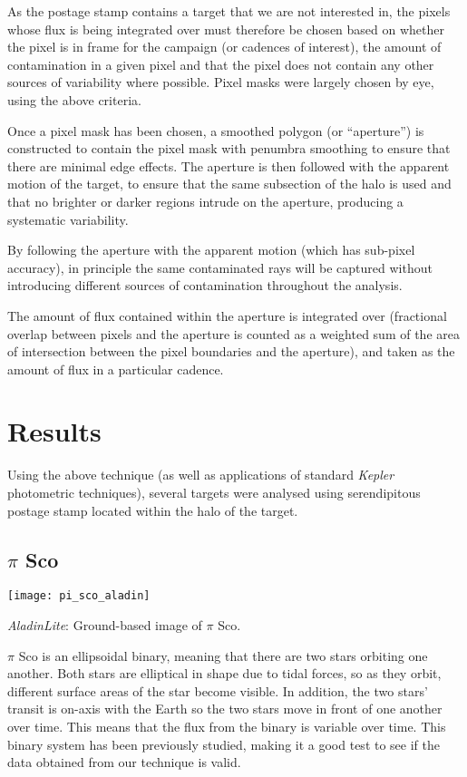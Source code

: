 \documentclass{book}
\begin{document}
As the postage stamp contains a target that we are not interested in, the
pixels whose flux is being integrated over must therefore be chosen based on
whether the pixel is in frame for the campaign (or cadences of interest), the
amount of contamination in a given pixel and that the pixel does not contain
any other sources of variability where possible. Pixel masks were largely chosen
by eye, using the above criteria.

Once a pixel mask has been chosen, a smoothed polygon (or ``aperture'') is
constructed to contain the pixel mask with penumbra smoothing to ensure that
there are minimal edge effects. The aperture is then followed with the apparent
motion of the target, to ensure that the same subsection of the halo is used and
that no brighter or darker regions intrude on the aperture, producing a
systematic variability.

By following the aperture with the apparent motion (which has sub-pixel
accuracy), in principle the same contaminated rays will be captured without
introducing different sources of contamination throughout the analysis.

The amount of flux contained within the aperture is integrated over (fractional
overlap between pixels and the aperture is counted as a weighted sum of the
area of intersection between the pixel boundaries and the aperture), and taken
as the amount of flux in a particular cadence.

\section{Results}

Using the above technique (as well as applications of standard \textit{Kepler}
photometric techniques), several targets were analysed using serendipitous
postage stamp located within the halo of the target.

\subsection{$\pi$ Sco}

\begin{staticfigure}
	\centering
		\texttt{[image: pi\_sco\_aladin]}
	\caption{\textit{AladinLite}: Ground-based image of $\pi$ Sco.}
\end{staticfigure}

$\pi$ Sco is an ellipsoidal binary, meaning that there are two stars orbiting
one another. Both stars are elliptical in shape due to tidal forces, so as they
orbit, different surface areas of the star become visible. In addition, the two
stars' transit is on-axis with the Earth so the two stars move in front of one
another over time. This means that the flux from the binary is variable over
time. This binary system has been previously studied, making it a good test to
see if the data obtained from our technique is valid.
\end{document}
